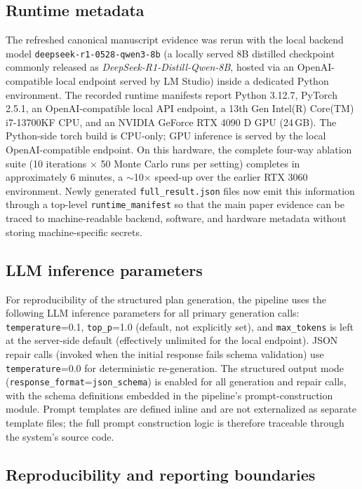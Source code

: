 \subsection{Runtime metadata}

The refreshed canonical manuscript evidence was rerun with the local backend model \texttt{deepseek-r1-0528-qwen3-8b} (a locally served 8B distilled checkpoint commonly released as \emph{DeepSeek-R1-Distill-Qwen-8B}, hosted via an OpenAI-compatible local endpoint served by LM Studio) inside a dedicated Python environment. The recorded runtime manifests report Python 3.12.7, PyTorch 2.5.1, an OpenAI-compatible local API endpoint, a 13th Gen Intel(R) Core(TM) i7-13700KF CPU, and an NVIDIA GeForce RTX 4090 D GPU (24\,GB). The Python-side torch build is CPU-only; GPU inference is served by the local OpenAI-compatible endpoint. On this hardware, the complete four-way ablation suite (10 iterations $\times$ 50 Monte Carlo runs per setting) completes in approximately 6 minutes, a $\sim$10$\times$ speed-up over the earlier RTX 3060 environment. Newly generated \texttt{full\_result.json} files now emit this information through a top-level \texttt{runtime\_manifest} so that the main paper evidence can be traced to machine-readable backend, software, and hardware metadata without storing machine-specific secrets.

\subsection{LLM inference parameters}

For reproducibility of the structured plan generation, the pipeline uses the following LLM inference parameters for all primary generation calls: \texttt{temperature}=0.1, \texttt{top\_p}=1.0 (default, not explicitly set), and \texttt{max\_tokens} is left at the server-side default (effectively unlimited for the local endpoint). JSON repair calls (invoked when the initial response fails schema validation) use \texttt{temperature}=0.0 for deterministic re-generation. The structured output mode (\texttt{response\_format}=\texttt{json\_schema}) is enabled for all generation and repair calls, with the schema definitions embedded in the pipeline's prompt-construction module. Prompt templates are defined inline and are not externalized as separate template files; the full prompt construction logic is therefore traceable through the system's source code.

\subsection{Reproducibility and reporting boundaries}

